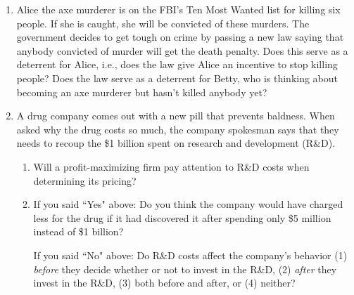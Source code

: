 \begin{enumerate}
\item Alice the axe murderer is on the FBI's Ten Most Wanted list for killing six people. If she is caught, she will be convicted of these murders. The government decides to get tough on crime by passing a new law saying that anybody convicted of murder will get the death penalty. Does this serve as a deterrent for Alice, i.e., does the law give Alice an incentive to stop killing people? Does the law serve as a deterrent for Betty, who is thinking about becoming an axe murderer but hasn't killed anybody yet?%




\item {} A drug company comes out with a new pill that prevents baldness. When asked why the drug costs so much, the company spokesman says that they needs to recoup the \$1 billion spent on research and development (R\&D).

\begin{enumerate}

\item Will a profit-maximizing firm pay attention to R\&D costs when determining its pricing?

\item If you said ``Yes" above: Do you think the company would have charged less for the drug if it had discovered it after spending only \$5 million instead of \$1 billion?

If you said ``No" above: Do R\&D costs affect the company's behavior (1) \emph{before} they decide whether or not to invest in the R\&D, (2) \emph{after} they invest in the R\&D, (3) both before and after, or (4) neither?%

\end{enumerate}

\end{enumerate}

